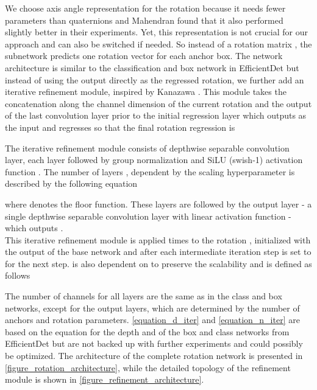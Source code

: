 \documentclass[twocolumn, 10pt, letterpaper]{article}
\begin{document}
We choose axis angle representation for the rotation because it needs fewer parameters than quaternions and Mahendran \etal\cite{axis_angle_vs_quaternion} found that it also performed slightly better in their experiments. Yet, this representation is not crucial for our approach and can also be switched if needed. So instead of a rotation matrix , the subnetwork predicts one rotation vector  for each anchor box. The network architecture is similar to the classification and box network in EfficientDet\cite{EfficientDet} but instead of using the output  directly as the regressed rotation, we further add an iterative refinement module, inspired by Kanazawa \etal\cite{HMR}. This module takes the concatenation along the channel dimension of the current rotation  and the output of the last convolution layer prior to the initial regression layer which outputs  as the input and regresses  so that the final rotation regression is 

The iterative refinement module consists of  depthwise separable convolution layer\cite{DepthwiseSeparableConv}, each layer followed by group normalization \cite{GroupNorm} and SiLU (swish-1) activation function \cite{swish_1}\cite{swish_2}\cite{swish_3}. The number of layers , dependent by the scaling hyperparameter  is described by the following equation

where  denotes the floor function. These layers are followed by the output layer - a single depthwise separable convolution layer with linear activation function - which outputs .\\

This iterative refinement module is applied  times to the rotation , initialized with the output of the base network  and after each intermediate iteration step  is set to  for the next step.  is also dependent on  to preserve the scalability and is defined as follows

The number of channels for all layers are the same as in the class and box networks, except for the output layers, which are determined by the number of anchors and rotation parameters. \autoref{equation_d_iter} and \autoref{equation_n_iter} are based on the equation for the depth  and  of the box and class networks from EfficientDet\cite{EfficientDet} but are not backed up with further experiments and could possibly be optimized. The architecture of the complete rotation network is presented in \autoref{figure_rotation_architecture}, while the detailed topology of the refinement module is shown in \autoref{figure_refinement_architecture}.\\
\end{document}
